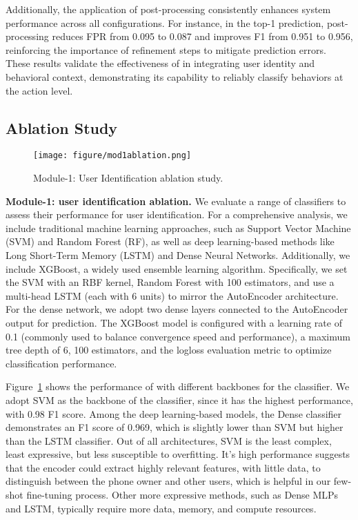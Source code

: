     Additionally, the application of post-processing consistently enhances system performance across all configurations. For instance, in the top-1 prediction, post-processing reduces FPR from 0.095 to 0.087 and improves F1 from 0.951 to 0.956, reinforcing the importance of refinement steps to mitigate prediction errors. These results validate the effectiveness of \sys in integrating user identity and behavioral context, demonstrating its capability to reliably classify behaviors at the action level.


\subsection{Ablation Study}
\label{subsec:ablation_study}

            \begin{figure}[htbp!]
                \centering\texttt{[image: figure/mod1ablation.png]}%
            \caption{Module-1: User Identification ablation study.}\label{fig:mod1ablation}
            \end{figure}
    
    
\noindent\textbf{Module-1: user identification ablation.} We evaluate a range of classifiers to assess their performance for user identification. For a comprehensive analysis, we include traditional machine learning approaches, such as Support Vector Machine (SVM) and Random Forest (RF), as well as deep learning-based methods like Long Short-Term Memory (LSTM) and Dense Neural Networks. Additionally, we include XGBoost, a widely used ensemble learning algorithm. Specifically, we set the SVM with an RBF kernel, Random Forest with 100 estimators, and use a multi-head LSTM (each with 6 units) to mirror the AutoEncoder architecture. For the dense network, we adopt two dense layers connected to the AutoEncoder output for prediction. The XGBoost model is configured with a learning rate of 0.1 (commonly used to balance convergence speed and performance), a maximum tree depth of 6, 100 estimators, and the logloss evaluation metric to optimize classification performance.

Figure~\ref{fig:mod1ablation} shows the performance of \sys with different backbones for the classifier. We adopt SVM as the backbone of the classifier, since it has the highest performance, with 0.98 F1 score. Among the deep learning-based models, the Dense classifier demonstrates an F1 score of 0.969, which is slightly lower than SVM but higher than the LSTM classifier. Out of all architectures, SVM is the least complex, least expressive, but less susceptible to overfitting. It's high performance suggests that the encoder could extract highly relevant features, with little data, to distinguish between the phone owner and other users, which is helpful in our few-shot fine-tuning process. Other more expressive methods, such as Dense MLPs and LSTM, typically require more data, memory, and compute resources.

